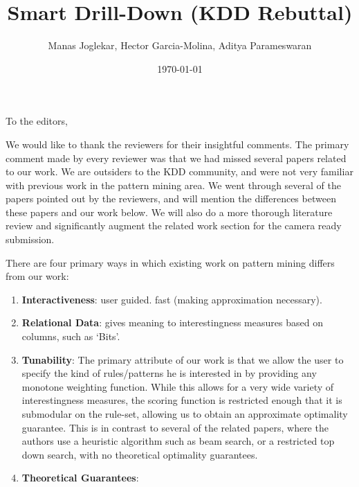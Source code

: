 \documentclass{article}
\date{\today}
\begin{document}
\title{Smart Drill-Down (KDD Rebuttal)}
\author{Manas Joglekar, Hector Garcia-Molina, Aditya Parameswaran}
\maketitle
To the editors,

We would like to thank the reviewers for their insightful comments. The primary comment made by every reviewer was that we had missed several papers related to our work. We are outsiders to the KDD community, and were not very familiar with previous work in the pattern mining area. We went through several of the papers pointed out by the reviewers, and will mention the differences between these papers and our work below. We will also do a more thorough literature review and significantly augment the related work section for the camera ready submission. 

There are four primary ways in which existing work on pattern mining differs from our work:
\begin{enumerate}
\item {\bf Interactiveness}: user guided. fast (making approximation necessary). 

\item {\bf Relational Data}: gives meaning to interestingness measures based on columns, such as `Bits'. 

\item {\bf Tunability}: The primary attribute of our work is that we allow the user to specify the kind of rules/patterns he is interested in by providing any monotone weighting function. While this allows for a very wide variety of interestingness measures, the scoring function is restricted enough that it is submodular on the rule-set, allowing us to obtain an approximate optimality guarantee. This is in contrast to several of the related papers, where the authors use a heuristic algorithm such as beam search, or a restricted top down search, with no theoretical optimality guarantees. 

\item {\bf Theoretical Guarantees}:
\end{enumerate}

\end{document}
